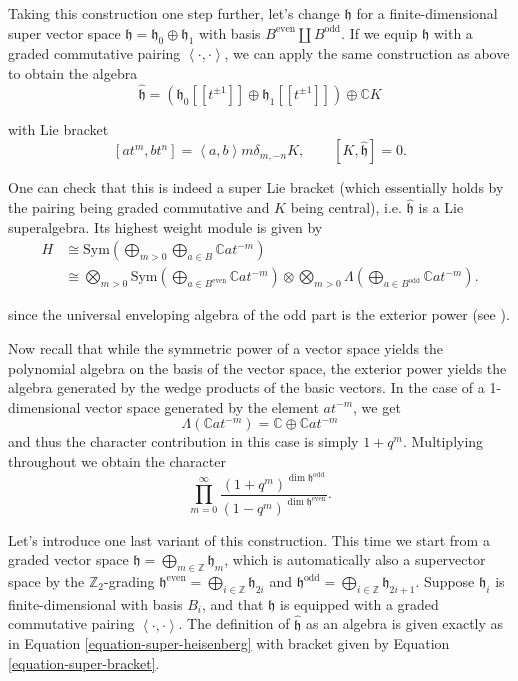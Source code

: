 \medskip\noindent
Taking this construction one step further,
let's change $\mathfrak{h}$ for a finite-dimensional
super vector space $\mathfrak{h}=\mathfrak{h}_0\oplus \mathfrak{h}_1$
with basis $B^{\text{even}}\amalg B^{\text{odd}}$.
If we equip $\mathfrak{h}$ with a graded commutative
pairing $\left<\cdot,\cdot\right>$, we can
apply the same construction as above
to obtain the algebra
\begin{equation}
\label{equation-super-heisenberg}
\hat{\mathfrak{h}}
=(\mathfrak{h}_0[[t^{\pm 1}]]\oplus\mathfrak{h}_1[[t^{\pm 1}]])
\oplus\mathbb{C}K
\end{equation}

\noindent
with Lie bracket
\begin{equation}
\label{equation-super-bracket}
[at^m,bt^n]=\left<a,b\right>m\delta_{m,-n}K,\qquad 
[K,\hat{\mathfrak{h}}]=0.
\end{equation}

\noindent
One can check that this is indeed a super Lie bracket
(which essentially holds by the pairing being graded commutative
and $K$ being central),
i.e. $\hat{\mathfrak{h}}$ is a Lie superalgebra.
Its highest weight module is given by
\begin{align*}
H&\cong \text{Sym}\left(\bigoplus_{m>0}\bigoplus_{a \in B}
\mathbb{C}at^{-m}\right)\\
&\cong \bigotimes_{m>0}\text{Sym}\left(\bigoplus_{a \in B^{\text{even}}}
\mathbb{C}at^{-m}\right)
\otimes\bigotimes_{m>0}
\Lambda\left(\bigoplus_{a \in B^{\text{odd}}}
\mathbb{C}at^{-m}\right).
\end{align*}

\noindent
since the universal enveloping algebra of the odd
part is the exterior power (see \cite[Video 8]{videos}).

Now recall that while the symmetric power of a vector
space yields the polynomial algebra on the basis of the vector space,
the exterior power yields the algebra generated
by the wedge products of the basic vectors.
In the case of a 1-dimensional vector space generated
by the element $at^{-m}$, we get
$$
\Lambda(\mathbb{C}at^{-m})=\mathbb{C} \oplus \mathbb{C}at^{-m}
$$
and thus the character contribution in this case is simply
$
1+q^m.
$
Multiplying throughout we obtain the character
$$
\prod_{m=0}^\infty \frac{(1+q^m)^{\dim \mathfrak{h}^{\text{odd}}}}{
(1-q^m)^{\dim \mathfrak{h}^{\text{even}}}}.
$$

\medskip\noindent
Let's introduce one last variant of this construction.
This time we start from a graded vector space
$\mathfrak{h}=\bigoplus_{m \in \mathbb{Z}}\mathfrak{h}_m$,
which is automatically also a supervector space
by the $\mathbb{Z}_2$-grading
$\mathfrak{h}^{\text{even}}=\bigoplus_{i \in \mathbb{Z}}\mathfrak{h}_{2i}$ 
and $\mathfrak{h}^{\text{odd}}=\bigoplus_{i \in \mathbb{Z}}\mathfrak{h}_{2i+1}$.
Suppose $\mathfrak{h}_i$ is finite-dimensional with basis $B_i$,
and that $\mathfrak{h}$ is equipped with a graded commutative
pairing $\left<\cdot,\cdot\right>$.
The definition of $\hat{\mathfrak{h}}$ as an algebra
is given exactly as in Equation \ref{equation-super-heisenberg}
with bracket given by Equation \ref{equation-super-bracket}.

